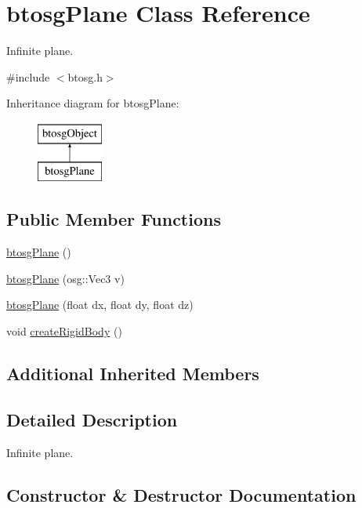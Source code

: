 \hypertarget{classbtosgPlane}{}\section{btosg\+Plane Class Reference}
\label{classbtosgPlane}


Infinite plane.  




{\ttfamily \#include $<$btosg.\+h$>$}

Inheritance diagram for btosg\+Plane\+:\begin{figure}[H]
\begin{center}
\leavevmode
\includegraphics[height=2.000000cm]{classbtosgPlane}
\end{center}
\end{figure}
\subsection*{Public Member Functions}
\begin{DoxyCompactItemize}
\item 
\hyperlink{classbtosgPlane_a363737cea03a886470a1a46003706268}{btosg\+Plane} ()
\item 
\hyperlink{classbtosgPlane_a4bc8b74d62426eb5fa66355b71569db2}{btosg\+Plane} (osg\+::\+Vec3 v)
\item 
\hyperlink{classbtosgPlane_a295ebe4cb55a2786764c7840d10895f4}{btosg\+Plane} (float dx, float dy, float dz)
\item 
void \hyperlink{classbtosgPlane_a0e6812c186ed1fa128dccf7cd2e525a6}{create\+Rigid\+Body} ()
\end{DoxyCompactItemize}
\subsection*{Additional Inherited Members}


\subsection{Detailed Description}
Infinite plane. 

\subsection{Constructor \& Destructor Documentation}
\mbox{\label{classbtosgPlane_a363737cea03a886470a1a46003706268}} 
